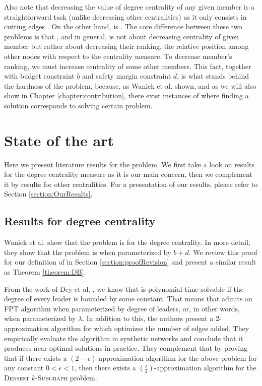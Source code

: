 Also note that decreasing the value of degree centrality of any given member is a straightforward task
(unlike decreasing other centralities) as it only consists in cutting edges \cite{Waniek2016}.
On the other hand, \HLdeg is \NPc \cite{Waniek2017}.
The core difference between these two problems is that \HLdeg, and \HLshort in general,
is not about decreasing centrality of given member but rather about decreasing their ranking,
the relative position among other nodes with respect to the centrality measure.
To decrease member's ranking, we must increase centrality of some other members.
This fact, together with budget constraint $b$ and safety margin constraint $d$,
is what stands behind the hardness of the \HL problem, because,
as Waniek et al. \cite{Waniek2017} shown, and as we will also show in Chapter \ref{chapter:contribution},
there exist instances of \HLshort where finding a solution corresponds to solving certain \NPh problem.


\section{State of the art}

Here we present literature results for the \HL problem.
We first take a look on results for the degree centrality measure as it is our main concern, then we
complement it by results for other centralities.
For a presentation of our results, please refer to Section \ref{section:OurResults}.


\subsection{Results for degree centrality}\label{subsection:ResultsDegree}

Waniek et al. \cite{Waniek2017} show that the \HL problem is \NPc for the degree centrality.
In more detail, they show that the problem is \Wh when parameterized by $b+d$.
We review this proof for our definition of \HLshort in Section \ref{section:proofRevision} and present
a similar result as Theorem \ref{theorem:DB}.

From the work of Dey et al. \cite{Dey2019}, we know that \HLdeg is polynomial time solvable
if the degree of every leader is bounded by some constant.
That means that \HLdeg admits an FPT algorithm when parameterized by degree of leaders, or,
in other words, when parameterized by $\lambda$.
In addition to this, the authors present a $2$-approximation algorithm for \HLdeg which optimizes
the number of edges added.
They empirically evaluate the algorithm in synthetic networks and conclude that it produces near
optimal solutions in practice.
They complement that by proving that if there exists a $(2-\epsilon)$-approximation algorithm
for the above problem for any constant $0 < \epsilon < 1$, then there exists
a $(\frac{\epsilon}{2})$-approximation algorithm for the \textsc{Densest} $k$-\textsc{Subgraph} problem.


